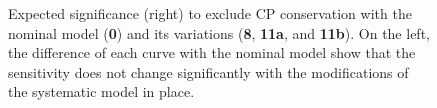 \begin{figure}
	\centering
	\resizebox{0.49\linewidth}{!}{}
	\resizebox{0.49\linewidth}{!}{}
	\caption[Sensitivity to $\delta_\text{CP} = 0$ with variations on the nominal systematic model]%
		{Expected significance (right) to exclude CP conservation with the nominal model (\textbf{0}) %
		and its variations (\textbf{8}, \textbf{11a}, and \textbf{11b}).
		On the left, the difference of each curve with the nominal model show that the sensitivity %
		does not change significantly with the modifications of the systematic model in place.}
	\label{fig:0_11a_11b_8_sensitivity}
\end{figure}

